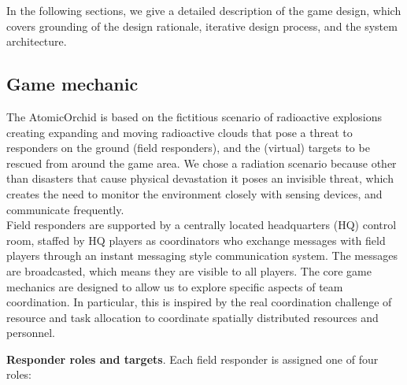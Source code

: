 In the following sections, we give a detailed description of the game design, which covers  grounding of the design rationale,  iterative design process, and the system architecture.

\subsection{Game mechanic} \label{sec:gameRatinale}
The AtomicOrchid is based on the fictitious scenario of radioactive explosions creating expanding and moving radioactive clouds that pose a threat to responders on the ground (field responders), and the (virtual) targets to be rescued from around the game area. We chose a radiation scenario because other than disasters that cause physical devastation it poses an invisible threat, which creates the need to monitor the environment closely with sensing devices, and communicate frequently.\\

Field responders are supported by a centrally located headquarters (HQ) control room, staffed by HQ players as coordinators who exchange messages with field players through an instant messaging style communication system. The messages are broadcasted, which means they are visible to all players. The core game mechanics are designed to allow us to explore specific aspects of team coordination. In particular, this is inspired by the real coordination challenge of resource and task allocation to coordinate spatially distributed resources and personnel. 



\textbf{Responder roles and targets}. Each field responder is assigned one of four roles:\\

